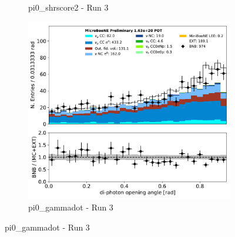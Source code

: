 \documentclass[a4paper]{article}
\begin{document}
\begin{figure}[H]
\begin{center}
\begin{subfigure}[b]{0.3\textwidth}
    \caption{\label{fig:pi0:inputs:shrscore2:RUN3} pi0\_shrscore2 - Run 3}
    \end{subfigure}
    \begin{subfigure}[b]{0.3\textwidth}
    \centering
    \includegraphics[width=1.00\textwidth]{pi0/pi0_gammadot_01152020_inputs_RUN3.pdf}
    \caption{\label{fig:pi0:inputs:gammadot:RUN3} pi0\_gammadot - Run 3}
    \end{subfigure}
\end{center}
\end{figure}
\end{document}
